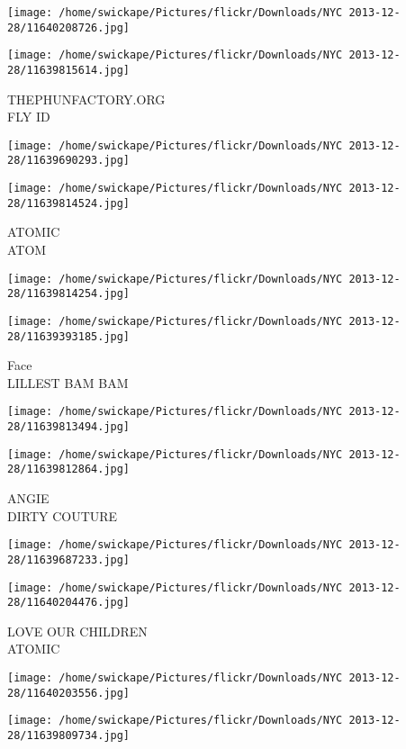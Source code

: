 \documentclass[10pt,letterpaper]{article}
\begin{document}
\texttt{[image: /home/swickape/Pictures/flickr/Downloads/NYC 2013-12-28/11640208726.jpg]}

\vspace{0.25in}
\texttt{[image: /home/swickape/Pictures/flickr/Downloads/NYC 2013-12-28/11639815614.jpg]}

THEPHUNFACTORY.ORG\\
FLY ID
\pagebreak

\texttt{[image: /home/swickape/Pictures/flickr/Downloads/NYC 2013-12-28/11639690293.jpg]}

\vspace{0.25in}
\texttt{[image: /home/swickape/Pictures/flickr/Downloads/NYC 2013-12-28/11639814524.jpg]}

ATOMIC\\
ATOM
\pagebreak

\texttt{[image: /home/swickape/Pictures/flickr/Downloads/NYC 2013-12-28/11639814254.jpg]}

\vspace{0.25in}
\texttt{[image: /home/swickape/Pictures/flickr/Downloads/NYC 2013-12-28/11639393185.jpg]}

Face\\
LILLEST BAM BAM
\pagebreak

\texttt{[image: /home/swickape/Pictures/flickr/Downloads/NYC 2013-12-28/11639813494.jpg]}

\vspace{0.25in}
\texttt{[image: /home/swickape/Pictures/flickr/Downloads/NYC 2013-12-28/11639812864.jpg]}

ANGIE\\
DIRTY COUTURE
\pagebreak

\texttt{[image: /home/swickape/Pictures/flickr/Downloads/NYC 2013-12-28/11639687233.jpg]}

\vspace{0.25in}
\texttt{[image: /home/swickape/Pictures/flickr/Downloads/NYC 2013-12-28/11640204476.jpg]}

LOVE OUR CHILDREN\\
ATOMIC
\pagebreak

\texttt{[image: /home/swickape/Pictures/flickr/Downloads/NYC 2013-12-28/11640203556.jpg]}

\vspace{0.25in}
\texttt{[image: /home/swickape/Pictures/flickr/Downloads/NYC 2013-12-28/11639809734.jpg]}
\end{document}
